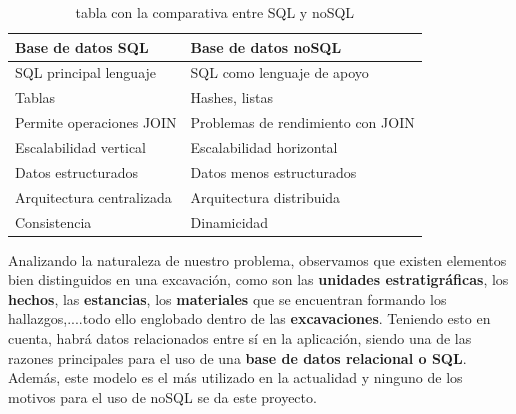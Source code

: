     \begin{table}[H]
        \begin{center}
            \begin{tabular}{ |l|l| } \hline
                \textbf{Base de datos SQL} & \textbf{Base de datos noSQL} \\ \hline
                SQL principal lenguaje & SQL como lenguaje de apoyo \\
                Tablas & Hashes, listas \\
                Permite operaciones JOIN & Problemas de rendimiento con JOIN \\
                Escalabilidad vertical & Escalabilidad horizontal \\
                Datos estructurados & Datos menos estructurados \\ 
                Arquitectura centralizada & Arquitectura distribuida \\
                Consistencia & Dinamicidad \\ \hline
            \end{tabular}
            \caption{tabla con la comparativa entre SQL y noSQL}
            \label{tab:databases}
        \end{center}
    \end{table}

Analizando la naturaleza de nuestro problema, observamos que existen elementos bien
distinguidos en una excavación, como son las \textbf{unidades estratigráficas}, los 
\textbf{hechos}, las \textbf{estancias}, los \textbf{materiales} que se encuentran formando
los hallazgos,....todo ello englobado dentro de las \textbf{excavaciones}. Teniendo esto en
cuenta, habrá datos relacionados entre sí en la aplicación, siendo una de las razones
principales para el uso de una \textbf{base de datos relacional o SQL}. Además, este modelo
es el más utilizado en la actualidad y ninguno de los motivos para el uso de noSQL se da
este proyecto.
